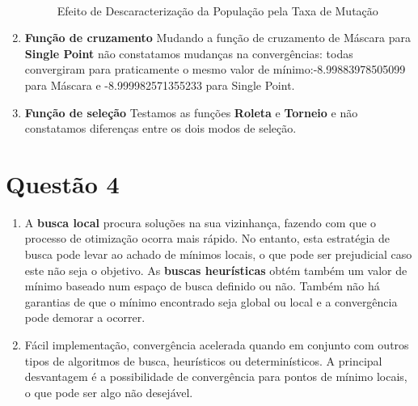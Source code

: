 \documentclass[a4paper, 12pt]{article}
\begin{document}
\begin{enumerate}[label=\alph*)]
\begin{figure}[H]
{						}
						~
					\caption{Efeito de Descaracterização da População pela Taxa de Mutação}
				\end{figure}
			\item \textbf{Função de cruzamento}
			Mudando a função de cruzamento de Máscara para \textbf{Single Point} não constatamos mudanças na convergências: todas convergiram para praticamente o mesmo valor de mínimo:-8.99883978505099 para Máscara e -8.999982571355233 para Single Point.
			\item \textbf{Função de seleção}
			Testamos as funções \textbf{Roleta} e \textbf{Torneio} e não constatamos diferenças entre os dois modos de seleção.
		\end{enumerate}
	 
	\section{Questão 4}
		\begin{enumerate}[label=\alph*)]
			\item A \textbf{busca local} procura soluções na sua vizinhança, fazendo com que o processo de otimização ocorra mais rápido.  No entanto, esta estratégia de busca pode levar ao achado de mínimos locais, o que pode ser prejudicial caso este não seja o objetivo.  As \textbf{buscas heurísticas} obtém também um valor de mínimo baseado num espaço de busca definido ou não.  Também não há garantias de que o mínimo encontrado seja global ou local e a convergência pode demorar a ocorrer.
			\item Fácil implementação, convergência acelerada quando em conjunto com outros tipos de algoritmos de busca, heurísticos ou determinísticos.  A principal desvantagem é a possibilidade de convergência para pontos de mínimo locais, o que pode ser algo não desejável.
		\end{enumerate}
	
\end{document}
